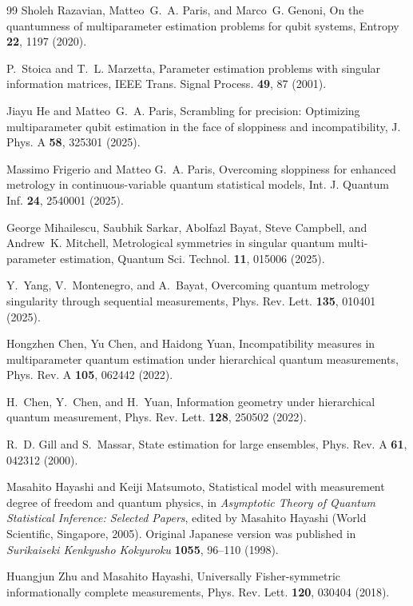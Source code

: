 \documentclass[
aps,
prl,
twocolumn,

superscriptaddress]{revtex4-2}
\begin{document}
\begin{thebibliography}{99}
Sholeh Razavian, Matteo~G.~A. Paris, and Marco~G. Genoni, On the quantumness
of multiparameter estimation problems for qubit systems, Entropy \textbf{22},
1197 (2020).

P.~Stoica and T.~L. Marzetta, Parameter estimation problems with singular
information matrices, IEEE Trans. Signal Process. \textbf{49}, 87 (2001).

Jiayu He and Matteo~G.~A. Paris, Scrambling for precision: Optimizing
multiparameter qubit estimation in the face of sloppiness and incompatibility,
J. Phys. A \textbf{58}, 325301 (2025).


Massimo Frigerio and Matteo G.~A. Paris, Overcoming sloppiness for enhanced
metrology in continuous-variable quantum statistical models, Int. J. Quantum
Inf. \textbf{24}, 2540001 (2025).

George Mihailescu, Saubhik Sarkar, Abolfazl Bayat, Steve Campbell, and
Andrew~K. Mitchell, Metrological symmetries in singular quantum multi-parameter
estimation, Quantum Sci. Technol. \textbf{11}, 015006 (2025).

Y.~Yang, V.~Montenegro, and A.~Bayat, Overcoming quantum metrology singularity
through sequential measurements, Phys. Rev. Lett. \textbf{135}, 010401 (2025).

Hongzhen Chen, Yu Chen, and Haidong Yuan, Incompatibility measures in
multiparameter quantum estimation under hierarchical quantum measurements,
Phys. Rev. A \textbf{105}, 062442 (2022).

H.~Chen, Y.~Chen, and H.~Yuan, Information geometry under hierarchical quantum
measurement, Phys. Rev. Lett. \textbf{128}, 250502 (2022).

R.~D. Gill and S.~Massar, State estimation for large ensembles, Phys. Rev. A
\textbf{61}, 042312 (2000).

Masahito Hayashi and Keiji Matsumoto, Statistical model with measurement degree
of freedom and quantum physics, in \textit{Asymptotic Theory of Quantum
Statistical Inference: Selected Papers}, edited by Masahito Hayashi
(World Scientific, Singapore, 2005). Original Japanese version was published
in \textit{Surikaiseki Kenkyusho Kokyuroku} \textbf{1055}, 96--110 (1998).

Huangjun Zhu and Masahito Hayashi, Universally Fisher-symmetric informationally
complete measurements, Phys. Rev. Lett. \textbf{120}, 030404 (2018).


\end{thebibliography}
\end{document}
